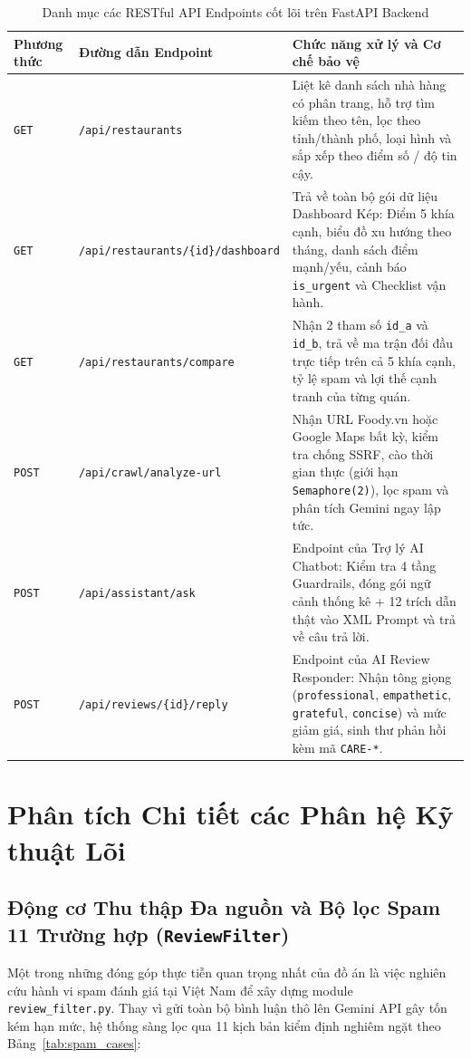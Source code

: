 \documentclass[12pt, a4paper]{article}
\begin{document}
\begin{table}[H]
\centering
\caption{Danh mục các RESTful API Endpoints cốt lõi trên FastAPI Backend}
\label{tab:api_endpoints}
\vspace{0.15cm}
\footnotesize
\begin{tabularx}{\textwidth}{l l X}
\toprule
\rowcolor{blue!8}
\textbf{Phương thức} & \textbf{Đường dẫn Endpoint} & \textbf{Chức năng xử lý và Cơ chế bảo vệ} \\
\midrule
\texttt{GET} & \texttt{/api/restaurants} & Liệt kê danh sách nhà hàng có phân trang, hỗ trợ tìm kiếm theo tên, lọc theo tỉnh/thành phố, loại hình và sắp xếp theo điểm số / độ tin cậy. \\
\addlinespace
\texttt{GET} & \texttt{/api/restaurants/\{id\}/dashboard} & Trả về toàn bộ gói dữ liệu Dashboard Kép: Điểm 5 khía cạnh, biểu đồ xu hướng theo tháng, danh sách điểm mạnh/yếu, cảnh báo \texttt{is\_urgent} và Checklist vận hành. \\
\addlinespace
\texttt{GET} & \texttt{/api/restaurants/compare} & Nhận 2 tham số \texttt{id\_a} và \texttt{id\_b}, trả về ma trận đối đầu trực tiếp trên cả 5 khía cạnh, tỷ lệ spam và lợi thế cạnh tranh của từng quán. \\
\addlinespace
\texttt{POST} & \texttt{/api/crawl/analyze-url} & Nhận URL Foody.vn hoặc Google Maps bất kỳ, kiểm tra chống SSRF, cào thời gian thực (giới hạn \texttt{Semaphore(2)}), lọc spam và phân tích Gemini ngay lập tức. \\
\addlinespace
\texttt{POST} & \texttt{/api/assistant/ask} & Endpoint của Trợ lý AI Chatbot: Kiểm tra 4 tầng Guardrails, đóng gói ngữ cảnh thống kê + 12 trích dẫn thật vào XML Prompt và trả về câu trả lời. \\
\addlinespace
\texttt{POST} & \texttt{/api/reviews/\{id\}/reply} & Endpoint của AI Review Responder: Nhận tông giọng (\texttt{professional}, \texttt{empathetic}, \texttt{grateful}, \texttt{concise}) và mức giảm giá, sinh thư phản hồi kèm mã \texttt{CARE-*}. \\
\bottomrule
\end{tabularx}
\end{table}

\newpage
\section{Phân tích Chi tiết các Phân hệ Kỹ thuật Lõi}

\subsection{Động cơ Thu thập Đa nguồn và Bộ lọc Spam 11 Trường hợp (\texttt{ReviewFilter})}
Một trong những đóng góp thực tiễn quan trọng nhất của đồ án là việc nghiên cứu hành vi spam đánh giá tại Việt Nam để xây dựng module \texttt{review\_filter.py}. Thay vì gửi toàn bộ bình luận thô lên Gemini API gây tốn kém hạn mức, hệ thống sàng lọc qua 11 kịch bản kiểm định nghiêm ngặt theo Bảng~\ref{tab:spam_cases}:
\end{document}

